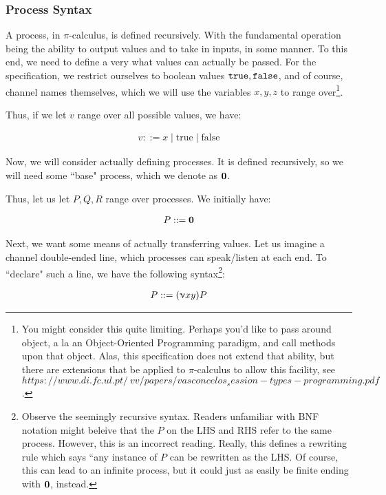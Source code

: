 \subsubsection{Process Syntax}
A process, in $\pi$-calculus, is defined recursively. With the fundamental operation being the ability to output values and to take in inputs, in some manner. To this end, we need to define a very what values can actually be passed. For the specification, we restrict ourselves to boolean values $\verb`true`, \verb`false`$, and of course, channel names themselves, which we will use the variables $x,y,z$ to range over\footnote{You might consider this quite limiting. Perhaps you'd like to pass around object, a la an Object-Oriented Programming paradigm, and call methods upon that object. Alas, this specification does not extend that ability, but there are extensions that be applied to $\pi$-calculus to allow this facility, see $https://www.di.fc.ul.pt/~vv/papers/vasconcelos_session-types-programming.pdf$. }.

Thus, if we let $v$ range over all possible values, we have:

\begin{align*}
    v ::= x \mid \text{true} \mid \text{false}
\end{align*}

Now, we will consider actually defining processes. It is defined recursively, so we will need some ``base" process, which we denote as $\textbf{0}$.

Thus, let us let $P,Q,R$ range over processes. We initially have:

\begin{align*}
    P ::= \textbf{0}
\end{align*}

Next, we want some means of actually transferring values. Let us imagine a channel double-ended line, which processes can speak/listen at each end. To ``declare" such a line, we have the following syntax\footnote{Observe the seemingly recursive syntax. Readers unfamiliar with BNF notation might beleive that the $P$ on the LHS and RHS refer to the same process. However, this is an incorrect reading. Really, this defines a rewriting rule which says ``any instance of $P$ can be rewritten as the LHS. Of course, this can lead to an infinite process, but it could just as easily be finite ending with $\textbf{0}$, instead.}:

\begin{align*}
P ::= (\upnu xy)P
\end{align*}

